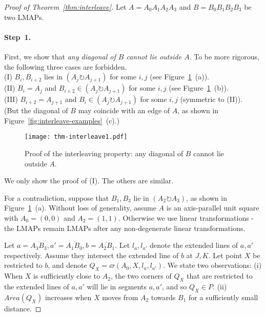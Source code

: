 \documentclass{ws-ijcga}
\begin{document}
\begin{proof}[Proof of Theorem~\ref{thm:interleave}]
Let $A=A_0A_1A_2A_3$ and $B=B_0B_1B_2B_3$ be two LMAPs.

\paragraph{Step~1.} First, we show that \emph{any diagonal of $B$ cannot lie outside $A$}.
To be more rigorous, the following three cases are forbidden.\\
(I)  $B_i,B_{i+2}$ lies in $(A_j\circlearrowright A_{j+1})$ for some $i,j$ (see Figure~\ref{fig:interleave1}~(a)).\\
(II) $B_i=A_j$ and $B_{i+2}\in (A_j\circlearrowright A_{j+1})$ for some $i,j$ (see Figure~\ref{fig:interleave1}~(b)).\\
(III) $B_{i+2}=A_{j+1}$ and $B_i \in (A_j\circlearrowright A_{j+1})$ for some $i,j$ (symmetric to (II)).\\
(But the diagonal of $B$ may coincide with an edge of $A$, as shown in Figure~\ref{fig:interleave-examples}~(c).)

\begin{figure}[h]
\centering\texttt{[image: thm-interleave1.pdf]}
\caption{Proof of the interleaving property: any diagonal of $B$ cannot lie outside $A$.}\label{fig:interleave1}
\end{figure}

We only show the proof of (I). The others are similar.

For a contradiction, suppose that $B_1,B_3$ lie in $(A_2\circlearrowright A_3)$, as shown in Figure~\ref{fig:interleave1}~(a).
Without loss of generality, assume $A$ is an axis-parallel unit square with $A_0=(0,0)$ and $A_2=(1,1)$.
Otherwise we use linear transformations - the LMAPs remain LMAPs after any non-degenerate linear transformations.

Let $a=\overline{A_3B_3},a'=\overline{A_1B_0},b=\overline{A_2B_1}$.
Let $l_a,l_{a'}$ denote the extended lines of $a,a'$ respectively.
Assume they intersect the extended line of $b$ at $J,K$.
Let point $X$ be restricted to $b$, and denote $Q_X=\parallelogram(A_0,X,l_a,l_{a'})$. We state two observations:
(i) When $X$ is sufficiently close to $A_2$, the two corners of $Q_X$ that are restricted to the extended lines of $a,a'$ will lie in segments $a,a'$,
and so $Q_X\in P$.
(ii) $Area(Q_X)$ increases when $X$ moves from $A_2$ towards $B_1$ for a sufficiently small distance.


\end{proof}
\end{document}
